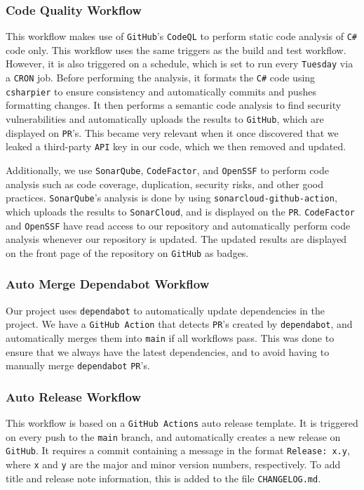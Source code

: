 \subsubsection{Code Quality Workflow}
This workflow makes use of \texttt{GitHub}'s \texttt{CodeQL}\cite{codeql} 
to perform static code analysis of \texttt{C\#} code only.
This workflow uses the same triggers as the build and test workflow. However, 
it is also triggered on a schedule, which is set to run every \texttt{Tuesday} via a \texttt{CRON} job.
Before performing the analysis, it formats the \texttt{C\#} code using \texttt{csharpier}\cite{csharpier} to 
ensure consistency and automatically commits and pushes formatting changes.
It then performs a semantic code analysis to find security vulnerabilities and 
automatically uploads the results to \texttt{GitHub}, which are displayed on \texttt{PR}'s.
This became very relevant when it once discovered that we leaked a third-party 
\texttt{API} key in our code, which we then removed and updated.

Additionally, we use \texttt{SonarQube}\cite{sonarqube}, \texttt{CodeFactor}\cite{codefactor}, and \texttt{OpenSSF}\cite{Openssf} 
to perform code analysis such as code coverage, duplication, 
security risks, and other good practices.
\texttt{SonarQube}'s analysis is done by using \texttt{sonarcloud-github-action}, which 
uploads the results to \texttt{SonarCloud}, and is displayed on the \texttt{PR}.
\texttt{CodeFactor} and \texttt{OpenSSF} have read access to our repository and automatically 
perform code analysis whenever our repository is updated.
The updated results are displayed on the front page of the repository on \texttt{GitHub} as badges.

\subsubsection{Auto Merge Dependabot Workflow}
Our project uses \texttt{dependabot} to automatically update dependencies in the project.
We have a \texttt{GitHub Action} that detects \texttt{PR}'s created by \texttt{dependabot}, and automatically merges 
them into \texttt{main} if all workflows pass.
This was done to ensure that we always have the latest dependencies,
and to avoid having to manually merge \texttt{dependabot} \texttt{PR}'s.

\subsubsection{Auto Release Workflow}
This workflow is based on a \texttt{GitHub Actions} auto release template\cite{auto-release}.
It is triggered on every push to the \texttt{main} branch, and automatically 
creates a new release on \texttt{GitHub}.
It requires a commit containing a message in the format \texttt{Release: x.y}, 
where \texttt{x} and \texttt{y} are the major and minor version numbers, respectively.
To add title and release note information, this is added to the file \texttt{CHANGELOG.md}.

